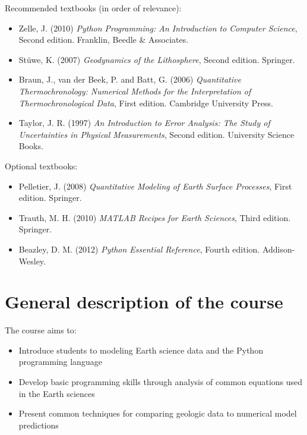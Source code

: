 \documentclass[11pt,a4paper]{article}
\begin{document}
\noindent Recommended textbooks (in order of relevance):
\begin{itemize}
  \item Zelle, J. (2010) \textit{Python Programming: An Introduction to Computer Science}, Second edition. Franklin, Beedle \& Associates.
  \item St\"{u}we, K. (2007) \textit{Geodynamics of the Lithosphere}, Second edition. Springer.
  \item Braun, J., van der Beek, P. and Batt, G. (2006) \textit{Quantitative Thermochronology: Numerical Methods for the Interpretation of Thermochronological Data}, First edition. Cambridge University Press.
  \item Taylor, J. R. (1997) \textit{An Introduction to Error Analysis: The Study of Uncertainties in Physical Measurements}, Second edition. University Science Books.
\end{itemize}
Optional textbooks:
\begin{itemize}
  \item Pelletier, J. (2008) \textit{Quantitative Modeling of Earth Surface Processes}, First edition. Springer.  
  \item Trauth, M. H. (2010) \textit{MATLAB\textsuperscript{\textregistered} Recipes for Earth Sciences}, Third edition. Springer.
  \item Beazley, D. M. (2012) \textit{Python Essential Reference}, Fourth edition. Addison-Wesley.
\end{itemize}


\section*{General description of the course}
The course aims to:
\begin{itemize}
  \item Introduce students to modeling Earth science data and the Python programming language
  \item Develop basic programming skills through analysis of common equations used in the Earth sciences
  \item Present common techniques for comparing geologic data to numerical model predictions
\end{itemize}
\end{document}

